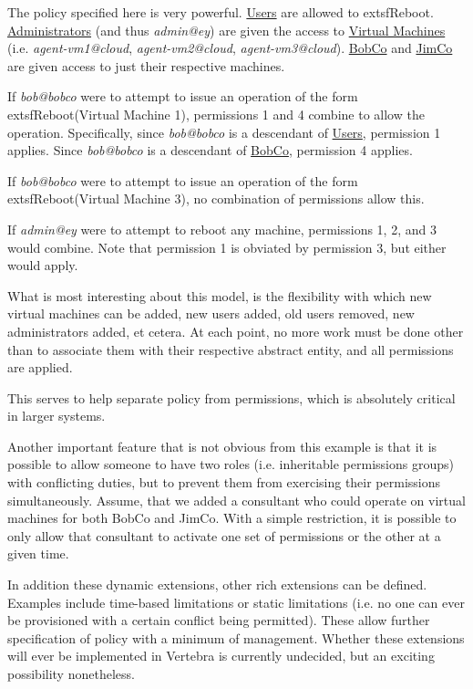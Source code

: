 The policy specified here is very powerful. \underline{Users} are allowed to         extsf{Reboot}.  \underline{Administrators} (and thus \emph{admin@ey}) are given the access to \underline{Virtual Machines} (i.e. \emph{agent-vm1@cloud}, \emph{agent-vm2@cloud}, \emph{agent-vm3@cloud}).  \underline{BobCo} and \underline{JimCo} are given access to just their respective machines.

If \emph{bob@bobco} were to attempt to issue an operation of the form         extsf{Reboot(Virtual Machine 1)}, permissions 1 and 4 combine to allow the operation.  Specifically, since \emph{bob@bobco} is a descendant of \underline{Users}, permission 1 applies.  Since \emph{bob@bobco} is a descendant of \underline{BobCo}, permission 4 applies.

If \emph{bob@bobco} were to attempt to issue an operation of the form         extsf{Reboot(Virtual Machine 3)}, no combination of permissions allow this.

If \emph{admin@ey} were to attempt to reboot any machine, permissions 1, 2, and 3 would combine.  Note that permission 1 is obviated by permission 3, but either would apply.

What is most interesting about this model, is the flexibility with which new virtual machines can be added, new users added, old users removed, new administrators added, et cetera.  At each point, no more work must be done other than to associate them with their respective abstract entity, and all permissions are applied.

This serves to help separate policy from permissions, which is absolutely critical in larger systems.

Another important feature that is not obvious from this example is that it is possible to allow someone to have two roles (i.e. inheritable permissions groups) with conflicting duties, but to prevent them from exercising their permissions simultaneously.  Assume, that we added a consultant who could operate on virtual machines for both BobCo and JimCo.  With a simple restriction, it is possible to only allow that consultant to activate one set of permissions or the other at a given time.

In addition these dynamic extensions, other rich extensions can be defined.  Examples include time-based limitations or static limitations (i.e. no one can ever be provisioned with a certain conflict being permitted).  These allow further specification of policy with a minimum of management.  Whether these extensions will ever be implemented in Vertebra is currently undecided, but an exciting possibility nonetheless.

